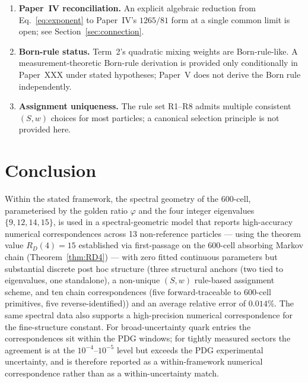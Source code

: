 \documentclass[12pt]{article}
\newcommand{\phig}{\varphi}
\begin{document}
\begin{enumerate}
    \item \textbf{Paper~IV reconciliation.} An explicit algebraic reduction from Eq.~\eqref{eq:exponent} to Paper~IV's $1265/81$ form at a single common limit is open; see Section~\ref{sec:connection}.
    \item \textbf{Born-rule status.} Term~2's quadratic mixing weights are Born-rule-like. A measurement-theoretic Born-rule derivation is provided only conditionally in Paper~XXX under stated hypotheses; Paper~V does not derive the Born rule independently.
    \item \textbf{Assignment uniqueness.} The rule set R1--R8 admits multiple consistent $(S,w)$ choices for most particles; a canonical selection principle is not provided here.
\end{enumerate}

\section{Conclusion}\label{sec:conclusion}

Within the stated framework, the spectral geometry of the 600-cell, parameterised by the golden ratio $\phig$ and the four integer eigenvalues $\{9, 12, 14, 15\}$, is used in a spectral-geometric model that reports high-accuracy numerical correspondences across 13 non-reference particles --- using the theorem value $R_D(4) = 15$ established via first-passage on the 600-cell absorbing Markov chain (Theorem~\ref{thm:RD4}) --- with zero fitted continuous parameters but substantial discrete post hoc structure (three structural anchors (two tied to eigenvalues, one standalone), a non-unique $(S,w)$ rule-based assignment scheme, and ten chain correspondences (five forward-traceable to 600-cell primitives, five reverse-identified)) and an average relative error of $0.014\%$. The same spectral data also supports a high-precision numerical correspondence for the fine-structure constant. For broad-uncertainty quark entries the correspondences sit within the PDG windows; for tightly measured sectors the agreement is at the $10^{-4}$--$10^{-5}$ level but exceeds the PDG experimental uncertainty, and is therefore reported as a within-framework numerical correspondence rather than as a within-uncertainty match.
\end{document}
